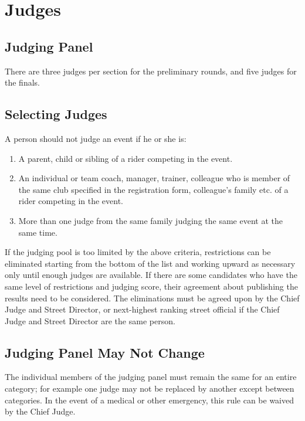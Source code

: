 \section{Judges}

\subsection{Judging Panel}

There are three judges  per section for the preliminary rounds, and five judges for the finals.

\subsection{Selecting Judges}
A person should not judge an event if he or she is:
\begin{enumerate}
\item A parent, child or sibling of a rider competing in the event.
\item An individual or team coach, manager, trainer, colleague who is member of the same club specified in the registration form, colleague's family etc. of a rider competing in the event.
\item More than one judge from the same family judging the same event at the same time.
\end{enumerate}

If the judging pool is too limited by the above criteria, restrictions can be eliminated starting from the bottom of the list and working upward as necessary only until enough judges are available.
If there are some candidates who have the same level of restrictions and judging score, their agreement about publishing the results need to be considered.
The eliminations must be agreed upon by the Chief Judge and Street Director, or next-highest ranking street official if the Chief Judge and Street Director are the same person.

\subsection{Judging Panel May Not Change}

The individual members of the judging panel must remain the same for an entire category; for example one judge may not be replaced by another except between categories.
In the event of a medical or other emergency, this rule can be waived by the Chief Judge.

